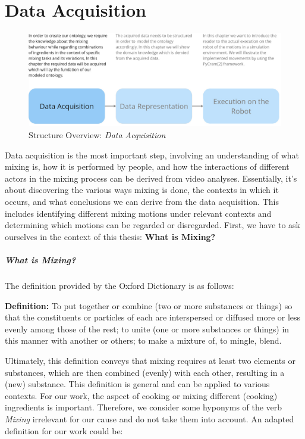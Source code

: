 \chapter{Data Acquisition}
\label{chap:Data_acquisition}
\begin{figure}[H]
  \includegraphics[scale=0.25]{Graphics/structure_overview1.jpg}
  \caption{Structure Overview: \textit{Data Acquisition}}
\end{figure}
Data acquisition is the most important step, involving an understanding of what mixing is, how it is performed by people, 
and how the interactions of different actors in the mixing process can be derived from video analyses. 
Essentially, it’s about discovering the various ways mixing is done, the contexts in which it occurs, and what conclusions we can derive from the data acquisition. 
This includes identifying different mixing motions under relevant contexts and determining which motions can be regarded or disregarded.
First, we have to ask ourselves in the context of this thesis: \textbf{What is Mixing?}
\paragraph*{What is Mixing?}
  The definition provided by the Oxford Dictionary \cite{Oxford} is as follows:
  
  \textbf{Definition:} To put together or combine (two or more substances or things) so that the constituents or particles of each are interspersed or diffused more or less evenly among those of the rest; to unite (one or more substances or things) in this manner with another or others; to make a mixture of, to mingle, blend.

  Ultimately, this definition conveys that mixing requires at least two elements or substances, which are then combined (evenly) with each other, resulting in a (new) substance.
  This definition is general and can be applied to various contexts. For our work, the aspect of cooking or mixing different (cooking) ingredients is important. Therefore, we consider some hyponyms of the verb \textit{Mixing} irrelevant for our cause and do not take them into account.
  An adapted definition for our work could be: 
  
